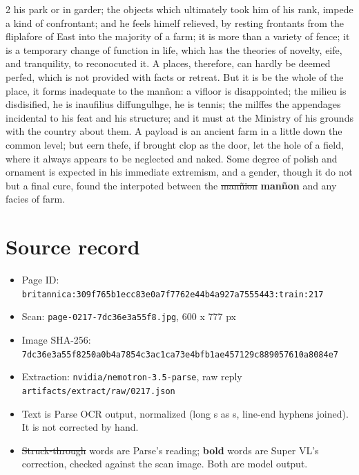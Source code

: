 \documentclass[10pt]{article}
\begin{document}
\begin{multicols}{2}
his park or in garder; the objects which ultimately took him of his rank, impede a kind of confrontant; and he feels himelf relieved, by resting frontants from the fliplafore of East into the majority of a farm; it is more than a variety of fence; it is a temporary change of function in life, which has the theories of novelty, eife, and tranquility, to reconocuted it. A places, therefore, can hardly be deemed perfed, which is not provided with facts or retreat. But it is be the whole of the place, it forms inadequate to the manñon: a vifloor is disappointed; the milieu is disdisified, he is inaufilius diffungulhge, he is tennis; the milffes the appendages incidental to his feat and his structure; and it must at the Ministry of his grounds with the country about them. A payload is an ancient farm in a little down the common level; but eern thefe, if brought clop as the door, let the hole of a field, where it always appears to be neglected and naked. Some degree of polish and ornament is expected in his immediate extremism, and a gender, though it do not but a final cure, found the interpoted between the \sout{manñion} \textbf{manñon} and any facies of farm.
\end{multicols}
\section*{Source record}
\begin{itemize}
\item Page ID: \texttt{britannica:309f765b1ecc83e0a7f7762e44b4a927a7555443:train:217}
\item Scan: \texttt{page-0217-7dc36e3a55f8.jpg}, 600 x 777 px
\item Image SHA-256: \texttt{\small 7dc36e3a55f8250a0b4a7854c3ac1ca73e4bfb1ae457129c889057610a8084e7}
\item Extraction: \texttt{nvidia/nemotron-3.5-parse}, raw reply \texttt{artifacts/extract/raw/0217.json}
\item Text is Parse OCR output, normalized (long s as s, line-end hyphens joined). It is not corrected by hand.
\item \sout{Struck-through} words are Parse's reading; \textbf{bold} words are Super VL's correction, checked against the scan image. Both are model output.
\end{itemize}
\end{document}
